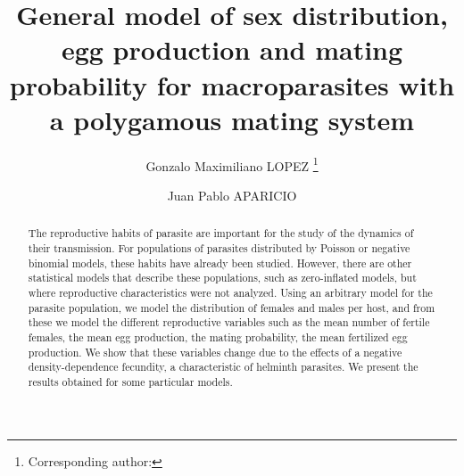 \documentclass[bimj,fleqn]{w-art}
\theoremstyle{plain}
\theoremstyle{definition}
\begin{document}

\title[General model of sex distribution, egg production and mating probability]{General model of sex distribution, egg production and mating probability for macroparasites with a polygamous mating system}
\author[Gonzalo Maximiliano LOPEZ {\it{et al.}}]{Gonzalo Maximiliano LOPEZ \footnote{Corresponding author: {}}} 
\address[\inst{1}]{Instituto de Investigaciones en Energ\'ia no Convencional, Consejo Nacional de Investigaciones Cient\'ificas y T\'ecnicas,	Universidad Nacional de Salta, Av. Bolivia 5150, 4400 Salta, Argentina.
	}
\author[]{Juan Pablo APARICIO}
\address[\inst{2}]{Departamento de Matem\'atica, Facultad de Ciencias Exactas, 	Universidad Nacional de Salta, Av. Bolivia 5150, 4400 Salta, Argentina.}
\address[\inst{3}]{Simon A. Levin Mathematical, Computational and Modeling Sciences Center, Arizona State University, PO Box 871904 Tempe, AZ 85287-1904, U.S.A.}

\begin{abstract}
The reproductive habits of parasite are important for the study of the dynamics of their transmission. 	For populations of parasites distributed by Poisson or negative binomial models, these habits have already been studied. 
However, there are other statistical models that describe these populations, such as zero-inflated models, but where reproductive characteristics were not analyzed. Using an arbitrary model for the parasite population, we model the distribution of females and males per host, and from these we model the different reproductive variables such as the mean number of fertile females, the mean egg production, the mating probability, the mean fertilized egg production.
We show that these variables change due to the effects of a negative density-dependence fecundity, a characteristic of helminth parasites. We present the results obtained for some particular models.
\end{abstract}
\end{document}
